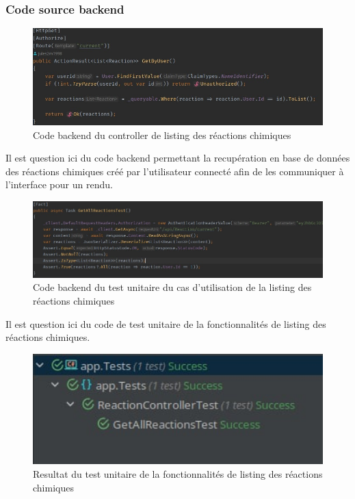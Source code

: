 \subsubsection{Code source backend}

\begin{figure}[H]
	\centering
	\includegraphics[width=1\textwidth]{img/clrea}
	\caption{Code backend du controller de listing des réactions chimiques}
\end{figure}

Il est question ici du code backend permettant la recupération en base de données des réactions chimiques créé par l'utilisateur connecté afin de les communiquer à l'interface pour un rendu.

\begin{figure}[H]
	\centering
	\includegraphics[width=1\textwidth]{img/utreaall}
	\caption{Code backend du test unitaire du cas d'utilisation de la listing des réactions chimiques}
\end{figure}

Il est question ici du code de test unitaire de la fonctionnalités de listing des réactions chimiques.

\begin{figure}[H]
	\centering
	\includegraphics[width=1\textwidth]{img/utrcr}
	\caption{Resultat du test unitaire de la fonctionnalités de listing des réactions chimiques}
\end{figure}

